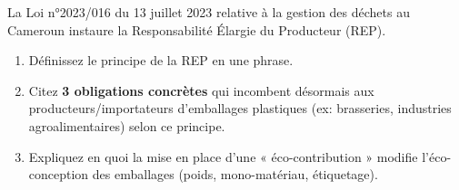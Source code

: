 \documentclass[11pt]{article}
\begin{document}
\begin{exercice}
La Loi n°2023/016 du 13 juillet 2023 relative à la gestion des déchets au Cameroun instaure la Responsabilité Élargie du Producteur (REP).
\begin{enumerate}
    \item Définissez le principe de la REP en une phrase.
    \item Citez \textbf{3 obligations concrètes} qui incombent désormais aux producteurs/importateurs d'emballages plastiques (ex: brasseries, industries agroalimentaires) selon ce principe.
    \item Expliquez en quoi la mise en place d'une « éco-contribution » modifie l'éco-conception des emballages (poids, mono-matériau, étiquetage).
\end{enumerate}
\end{exercice}
\end{document}
